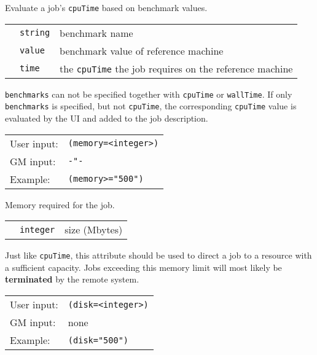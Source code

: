   Evaluate a job's \texttt{cpuTime} based on benchmark values.

  \begin{tabular}{llp{10cm}}
    \hspace*{1cm}&\texttt{string} & benchmark name\\
    \hspace*{1cm}&\texttt{value} & benchmark value of reference machine\\
    \hspace*{1cm}&\texttt{time} & the \texttt{cpuTime} the job requires on the reference machine\\
  \end{tabular}
  
  \texttt{benchmarks} can not be specified together with \texttt{cpuTime}
  or \texttt{wallTime}. If only \texttt{benchmarks} is specified, but not \texttt{cpuTime},
  the corresponding  \texttt{cpuTime} value is evaluated by the UI and added to the job description.

  \hspace*{0.5cm}
  \begin{shaded}
  \end{shaded}
  \begin{tabular}{lp{13cm}}
    User input:&\verb#(memory=<integer>)#\\
    GM input:&\verb#-"-#\\
    Example:&\verb#(memory>="500")#\\
  \end{tabular}

  Memory required for the job.

  \begin{tabular}{llp{10cm}}
    \hspace*{1cm}&\texttt{integer} & size (Mbytes)\\
  \end{tabular}

  \begin{framed}
    Just like \texttt{cpuTime}, this attribute should be used to
    direct a job to a resource with a sufficient capacity. Jobs
    exceeding this memory limit will most likely be \textbf{terminated}
    by the remote system.
  \end{framed}

  \hspace*{0.5cm}
  \begin{shaded}
  \end{shaded}
  \begin{tabular}{lp{13cm}}
    User input:&\verb#(disk=<integer>)#\\
    GM input:&none\\
    Example:&\verb#(disk="500")#\\
  \end{tabular}

